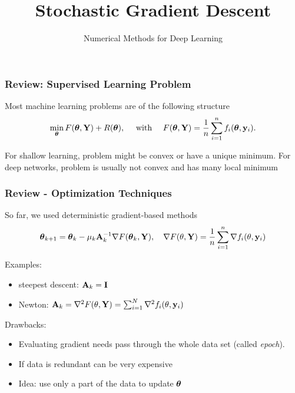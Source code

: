\documentclass[12pt,fleqn,beamer]{beamer}
\date{}
\title{Stochastic Gradient Descent}
\subtitle{Numerical Methods for Deep Learning}
\begin{document}
\makebeamertitle

\begin{frame}[fragile]\frametitle{Review: Supervised Learning Problem}

Most machine learning problems are of the following structure
$$
\min_{{\boldsymbol \theta}} F({\boldsymbol \theta},{\bf Y}) + R({\boldsymbol \theta}), \quad \text{ with }\quad  F({\boldsymbol \theta},{\bf Y}) = \frac1n\sum_{i=1}^n f_i({\boldsymbol \theta},{\bf y}_i).
$$

\bigskip
\pause

For shallow learning, problem might be convex or have a unique minimum.
For deep networks, problem is usually not convex and has many local minimum

\end{frame}

\begin{frame}[fragile]\frametitle{Review - Optimization Techniques}

So far, we used deterministic gradient-based methods
$$ {\boldsymbol \theta}_{k+1} = {\boldsymbol \theta}_k - \mu_k {\bf A}_k^{-1} \nabla F({\boldsymbol \theta}_k,{\bf Y}), \quad  \nabla F(\theta,{\bf Y}) = \frac1n  \sum_{i=1}^n \nabla f_i(\theta, {\bf y}_i)$$

\smallskip 
\pause

Examples: 
\begin{itemize}
	\item steepest descent: $ {\bf A}_k = {\bf I}$
	\item Newton: ${\bf A}_k = \nabla^{2} F(\theta,{\bf Y}) = \sum_{i=1}^N \nabla^{2} f_i(\theta, {\bf y}_i)$
\end{itemize}

\bigskip
\pause

Drawbacks:
\begin{itemize}
\item
Evaluating gradient needs pass through the whole data set (called \emph{epoch}).
\item
If data is redundant can be very expensive
\item 
Idea: use only a part of the data to update ${\boldsymbol \theta}$
\end{itemize} 



\end{frame}
\end{document}
